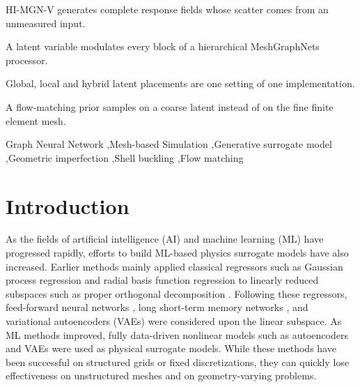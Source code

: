 \documentclass[preprint,12pt]{elsarticle}
\begin{document}
\begin{frontmatter}
\begin{abstract}
The model is evaluated on a shell-buckling dataset of 150 cylinders, each analysed 64 times with
a different random dimple that the model never sees, and on eight geometries outside the
training range with 256 FE analyses each. The generated scatter of the peak displacement is
compared with the FE scatter geometry by geometry and against the value that FE results alone
reach with the same number of samples. The deterministic HI-MGN and ports of two published
generative mesh surrogates, LDGN and SAR, are compared under the same protocol.
\end{abstract}

\begin{highlights}
\item HI-MGN-V generates complete response fields whose scatter comes from an unmeasured input.

\item A latent variable modulates every block of a hierarchical MeshGraphNets processor.

\item Global, local and hybrid latent placements are one setting of one implementation.

\item A flow-matching prior samples on a coarse latent instead of on the fine finite element mesh.
\end{highlights}

\begin{keyword}
Graph Neural Network \sep Mesh-based Simulation \sep Generative surrogate model \sep Geometric imperfection \sep Shell buckling \sep Flow matching
\end{keyword}

\end{frontmatter}

\section{Introduction}\label{sec:intro}

As the fields of artificial intelligence (AI) and machine learning (ML) have progressed rapidly,
efforts to build ML-based physics surrogate models have also increased. Earlier methods mainly
applied classical regressors such as Gaussian process regression and radial basis function
regression to linearly reduced subspaces such as proper orthogonal decomposition
\cite{Xiao:2019a,Moosavi:2018a,lee2020time}. Following these regressors, feed-forward neural
networks \cite{Hesthaven:2018a,lee2021parametric}, long short-term memory networks
\cite{mohan2018deep}, and variational autoencoders (VAEs) \cite{lee2024fsi,lee2024hvae} were
considered upon the linear subspace. As ML methods improved, fully data-driven nonlinear models
such as autoencoders \cite{kadeethum2022reduced,lee2020model} and VAEs
\cite{solera2023beta,lee2024thesis,lee2025physics} were used as physical surrogate models. While
these methods have been successful on structured grids or fixed discretizations, they can quickly
lose effectiveness on unstructured meshes and on geometry-varying problems.
\end{document}
